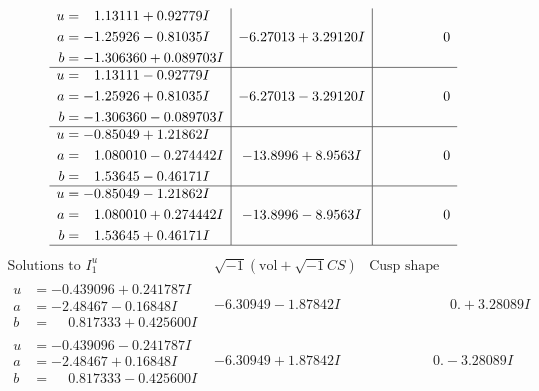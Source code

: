 \documentclass[1p]{elsarticle_modified}
\theoremstyle{definition}
\newcommand{\I}{\sqrt{-1}}
\begin{document}
$$\begin{array}{c|c|c}
\begin{aligned}
u &= \phantom{-}1.13111 + 0.92779 I \\
a &= -1.25926 - 0.81035 I \\
b &= -1.306360 + 0.089703 I\end{aligned}
 & -6.27013 + 3.29120 I & \phantom{-0.000000 } 0 \\ \hline\begin{aligned}
u &= \phantom{-}1.13111 - 0.92779 I \\
a &= -1.25926 + 0.81035 I \\
b &= -1.306360 - 0.089703 I\end{aligned}
 & -6.27013 - 3.29120 I & \phantom{-0.000000 } 0 \\ \hline\begin{aligned}
u &= -0.85049 + 1.21862 I \\
a &= \phantom{-}1.080010 - 0.274442 I \\
b &= \phantom{-}1.53645 - 0.46171 I\end{aligned}
 & -13.8996 + 8.9563 I & \phantom{-0.000000 } 0 \\ \hline\begin{aligned}
u &= -0.85049 - 1.21862 I \\
a &= \phantom{-}1.080010 + 0.274442 I \\
b &= \phantom{-}1.53645 + 0.46171 I\end{aligned}
 & -13.8996 - 8.9563 I & \phantom{-0.000000 } 0\\
 \hline 
 \end{array}$$\newpage$$\begin{array}{c|c|c}  
\text{Solutions to }I^u_{1}& \I (\text{vol} + \sqrt{-1}CS) & \text{Cusp shape}\\
 \hline 
\begin{aligned}
u &= -0.439096 + 0.241787 I \\
a &= -2.48467 - 0.16848 I \\
b &= \phantom{-}0.817333 + 0.425600 I\end{aligned}
 & -6.30949 - 1.87842 I & \phantom{-0.000000 -}0. + 3.28089 I \\ \hline\begin{aligned}
u &= -0.439096 - 0.241787 I \\
a &= -2.48467 + 0.16848 I \\
b &= \phantom{-}0.817333 - 0.425600 I\end{aligned}
 & -6.30949 + 1.87842 I & \phantom{-0.000000 } 0. - 3.28089 I \\ \hline\begin{aligned}

\end{aligned}
\end{array}$$
\end{document}
